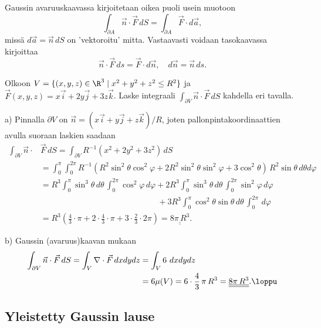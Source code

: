 Gaussin avaruuskaavassa kirjoitetaan oikea puoli usein muotoon
\[
\int_{\partial A} \vec n\cdot\vec F\,dS = \int_{\partial A} \vec F \cdot d\vec a,
\]
missä $d\vec a=\vec n\,dS$ on 'vektoroitu' mitta. Vastaavasti voidaan tasokaavassa kirjoittaa
\[
\vec n\cdot\vec F\,ds=\vec F\cdot d\vec n,\quad d\vec n=\vec n\,ds.
\]
\begin{Exa} Olkoon $V = \{(x,y,z) \in \R^3 \mid x^2+y^2+z^2 \le R^2\}$ ja 
$\vec F(x,y,z) = x\vec i + 2y\vec j + 3z\vec k$. Laske integraali 
$\int_{\partial V} \vec n\cdot\vec F\,dS$ kahdella eri tavalla.
\end{Exa}
\ratk a) Pinnalla $\partial V$ on $\vec n = (x\vec i + y\vec j + z\vec k)/R$, joten
pallonpintakoordinaattien avulla suoraan laskien saadaan
\begin{align*}
\int_{\partial V} 
\vec n\cdot &\vec F\,dS = \int_{\partial V} R^{-1}(x^2+2y^2+3z^2)\,dS \\
            &= \int_0^\pi\int_0^{2\pi} R^{-1}
               (R^2\sin^2\theta\cos^2\varphi+2R^2\sin^2\theta\sin^2\varphi
                                            +3\cos^2\theta)\,R^2\sin\theta\,d\theta d\varphi \\
            &=   R^3\int_0^\pi \sin^3\theta\,d\theta\,\int_0^{2\pi}\cos^2\varphi\,d\varphi
               +2R^3\int_0^\pi \sin^3\theta\,d\theta\,\int_0^{2\pi}\sin^2\varphi\,d\varphi \\
            &\phantom{=\ R^3\int_0^\pi 
                            \sin^2\theta\,d\theta\,\int_0^{2\pi}\cos^2\varphi\,d\varphi}
               +3R^3\int_0^\pi \cos^2\theta\sin\theta\,d\theta\,\int_0^{2\pi}\,d\varphi \\
            &= R^3\left(\frac{4}{3}\cdot\pi + 2\cdot\frac{4}{3}\cdot\pi 
                                            + 3\cdot\frac{2}{3}\cdot 2\pi\right)
             = \underline{\underline{8\pi\,R^3}}.
\end{align*}

b) Gaussin (avaruus)kaavan mukaan
\begin{align*}
\int_{\partial V} \vec n\cdot\vec F\,dS = \int_V \nabla\cdot\vec F\,dxdydz 
                                       &= \int_V 6\ dxdydz \\ 
                                       &= 6\mu(V) = 6\cdot\frac{4}{3}\,\pi\,R^3 
                                        = \underline{\underline{8\pi\,R^3}}. \loppu
\end{align*}

\subsection*{Yleistetty Gaussin lause}


